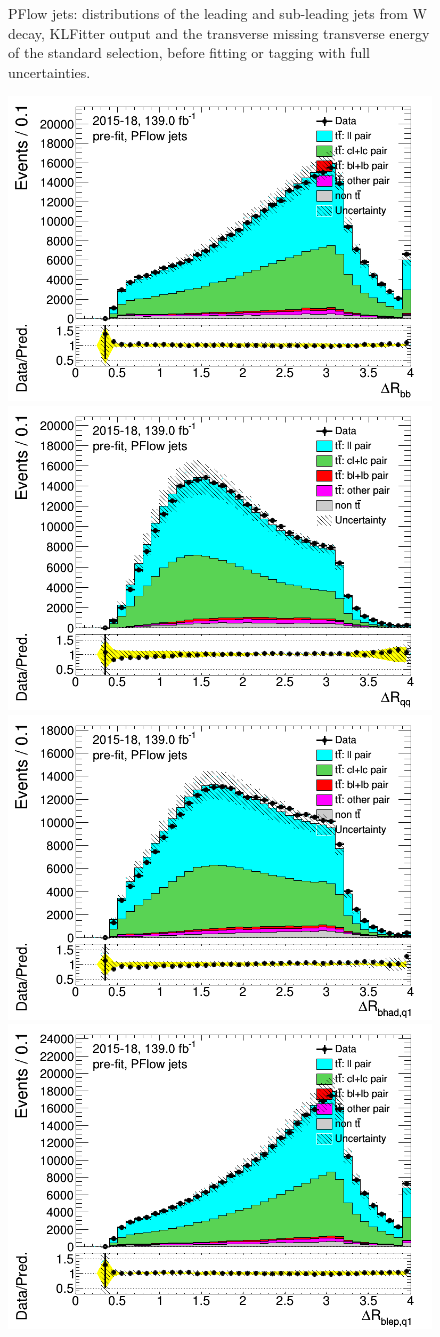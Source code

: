 \begin{figure}[H]
\caption{PFlow jets: distributions of the leading and sub-leading jets 
from W decay, KLFitter output and the transverse missing transverse 
energy of the standard selection, before fitting or tagging with 
full uncertainties.} \label{fig:standard_jets_PFlow}
\end{figure}

\newpage
\begin{figure}[H]
\includegraphics[width=.45\textwidth]{FTAG_plots/pretagNoRwwithouthighpTPFlowall/DataMC_h_dRbb.png}
\includegraphics[width=.45\textwidth]{FTAG_plots/pretagNoRwwithouthighpTPFlowall/DataMC_h_dRqq.png}\\
\includegraphics[width=.45\textwidth]{FTAG_plots/pretagNoRwwithouthighpTPFlowall/DataMC_h_dRbhadq1.png}
\includegraphics[width=.45\textwidth]{FTAG_plots/pretagNoRwwithouthighpTPFlowall/DataMC_h_dRblepq1.png} \\

\end{figure}
